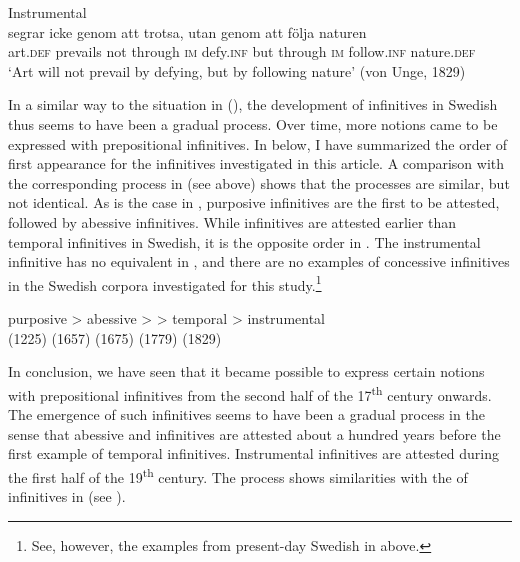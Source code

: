 \documentclass[output=paper]{langscibook}
\begin{document}
\ex Instrumental\label{ex:kalm:13b}\\
 segrar icke genom att trotsa, utan genom att följa naturen\\
art.\textsc{def} prevails not through \textsc{im} defy.\textsc{inf} but through \textsc{im} follow.\textsc{inf} nature.\textsc{def}\\
\glt ‘Art will not prevail by defying, but by following nature’ (von Unge, 1829)
\z 
\z 


In a similar way to the situation in  (\citealt{Schulte2007Prepositional,Schulte2007What}), the development of  infinitives in Swedish thus seems to have been a gradual process. Over time, more  notions came to be expressed with prepositional infinitives. In  below, I have summarized the order of first appearance for the  infinitives investigated in this article. A comparison with the corresponding process in  (see  above) shows that the processes are similar, but not identical. As is the case in , purposive infinitives are the first to be attested, followed by abessive infinitives. While  infinitives are attested earlier than temporal infinitives in Swedish, it is the opposite order in . The instrumental infinitive has no equivalent in , and there are no examples of concessive infinitives in the Swedish corpora investigated for this study.\footnote{See, however, the examples from present-day Swedish in  above.}     

\ea  \label{ex:kalm:14}
\gll {}purposive >  abessive  >  > temporal > instrumental\\
(1225) {} (1657) {} (1675) {} (1779) {} (1829)\\
\z 



In conclusion, we have seen that it became possible to express certain  notions with prepositional infinitives from the second half of the 17\textsuperscript{th} century onwards. The emergence of such  infinitives seems to have been a gradual process in the sense that abessive and  infinitives are attested about a hundred years before the first example of temporal infinitives. Instrumental infinitives are attested during the first half of the 19\textsuperscript{th} century. The process shows similarities with the  of  infinitives in  (see \citealt{Schulte2007Prepositional,Schulte2007What}). 
\end{document}
